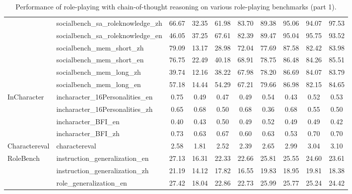 \begin{table*}[ht]
{\begin{tabular}{llcccccccc}
 & socialbench\_sa\_roleknowledge\_zh & 66.67 & 32.35 & 61.98 & 83.70 & 89.38 & 95.06 & 94.07 & 97.53 \\
 & socialbench\_sa\_roleknowledge\_en & 46.05 & 37.25 & 67.61 & 82.39 & 89.47 & 95.04 & 95.75 & 93.52 \\
 & socialbench\_mem\_short\_zh & 79.09 & 13.17 & 28.98 & 72.04 & 77.69 & 87.58 & 82.42 & 83.98 \\
 & socialbench\_mem\_short\_en & 76.75 & 22.49 & 40.18 & 68.91 & 78.75 & 86.48 & 84.26 & 85.51 \\
 & socialbench\_mem\_long\_zh & 39.74 & 12.16 & 38.22 & 67.98 & 78.20 & 86.69 & 84.07 & 83.79 \\
 & socialbench\_mem\_long\_en & 57.18 & 14.44 & 54.29 & 67.21 & 79.66 & 86.98 & 82.15 & 84.65 \\
 \midrule
\multirow{4}{*}{InCharacter} & incharacter\_16Personalities\_en & 0.75 & 0.49 & 0.47 & 0.49 & 0.54 & 0.43 & 0.52 & 0.53 \\
 & incharacter\_16Personalities\_zh & 0.65 & 0.68 & 0.50 & 0.68 & 0.36 & 0.68 & 0.55 & 0.50 \\
 & incharacter\_BFI\_en & 0.40 & 0.43 & 0.50 & 0.49 & 0.52 & 0.49 & 0.49 & 0.42 \\
 & incharacter\_BFI\_zh & 0.73 & 0.63 & 0.67 & 0.60 & 0.63 & 0.53 & 0.70 & 0.70 \\
 \midrule
Charactereval & charactereval & 2.58 & 1.81 & 2.52 & 2.39 & 2.65 & 2.99 & 3.04 & 3.10 \\
\midrule
\multirow{3}{*}{RoleBench} & instruction\_generalization\_en & 27.13 & 16.31 & 22.33 & 22.66 & 25.81 & 25.55 & 24.60 & 23.61 \\
 & instruction\_generalization\_zh & 21.19 & 14.12 & 17.82 & 16.55 & 19.83 & 18.95 & 19.81 & 18.38 \\
 & role\_generalization\_en & 27.42 & 18.04 & 22.86 & 22.73 & 25.99 & 25.77 & 25.24 & 24.42 \\
\bottomrule
\end{tabular}%
}
\caption{Performance of role-playing with chain-of-thought reasoning on various role-playing benchmarks (part 1).}
\label{tab:cot_performance_part_1}
\end{table*}


